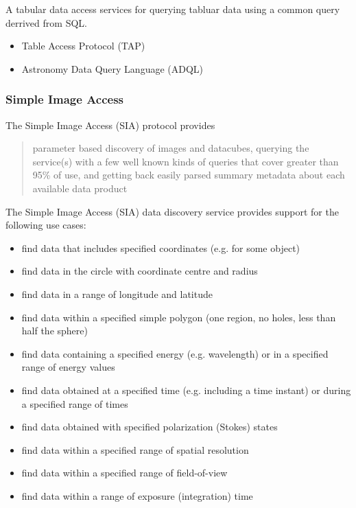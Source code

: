 \documentclass{article}
\begin{document}
A tabular data access services for querying tabluar data using a common query
derrived from SQL.

\begin{itemize}
  \item Table Access Protocol (TAP)
  \item Astronomy Data Query Language (ADQL)
\end{itemize}

\subsubsection{Simple Image Access}

The Simple Image Access (SIA) protocol provides 
\begin{quote}
parameter based discovery of images and datacubes, querying the service(s) with
a few well known kinds of queries that cover greater than 95\% of use, and
getting back easily parsed summary metadata about each available data product
\end{quote}

The Simple Image Access (SIA) data discovery service provides support for
the following use cases:

\begin{itemize}
  \item find data that includes specified coordinates (e.g. for some object) 
  \item find data in the circle with coordinate centre and radius 
  \item find data in a range of longitude and latitude 
  \item find data within a specified simple  polygon (one region, no holes, less
  than half the sphere)
  \item find data containing a specified energy (e.g. wavelength) or in a
  specified range of energy values
  \item find data obtained at a specified time (e.g. including a time instant)
  or during a specified range of times
  \item find data obtained with specified polarization (Stokes) states 
  \item find data within a specified range of spatial resolution 
  \item find data within a specified range of field-of-view 
  \item find data within a range of exposure (integration) time 
\end{itemize}
\end{document}
